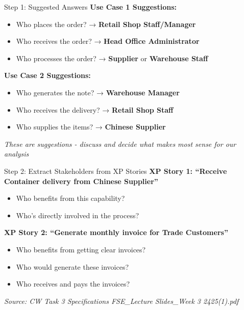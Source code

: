 \documentclass[
  ignorenonframetext,
]{beamer}
\providecommand{\tightlist}{%
  \setlength{\itemsep}{0pt}\setlength{\parskip}{0pt}}
\begin{document}
\begin{frame}{Step 1: Suggested Answers}
\label{step-1-suggested-answers}
\textbf{Use Case 1 Suggestions:}

\begin{itemize}
\tightlist
\item
  Who places the order? → \textbf{Retail Shop Staff/Manager}
\item
  Who receives the order? → \textbf{Head Office Administrator}
\item
  Who processes the order? → \textbf{Supplier} or \textbf{Warehouse
  Staff}
\end{itemize}

\textbf{Use Case 2 Suggestions:}

\begin{itemize}
\tightlist
\item
  Who generates the note? → \textbf{Warehouse Manager}
\item
  Who receives the delivery? → \textbf{Retail Shop Staff}
\item
  Who supplies the items? → \textbf{Chinese Supplier}
\end{itemize}

\emph{These are suggestions - discuss and decide what makes most sense
for our analysis}
\end{frame}

\begin{frame}{Step 2: Extract Stakeholders from XP Stories}
\label{step-2-extract-stakeholders-from-xp-stories}
\textbf{XP Story 1: ``Receive Container delivery from Chinese
Supplier''}

\begin{itemize}
\tightlist
\item
  Who benefits from this capability?
\item
  Who's directly involved in the process?
\end{itemize}

\textbf{XP Story 2: ``Generate monthly invoice for Trade Customers''}

\begin{itemize}
\tightlist
\item
  Who benefits from getting clear invoices?
\item
  Who would generate these invoices?
\item
  Who receives and pays the invoices?
\end{itemize}

\emph{Source: CW Task 3 Specifications \textbar{} FSE\_Lecture
Slides\_Week 3 2425(1).pdf}
\end{frame}
\end{document}
